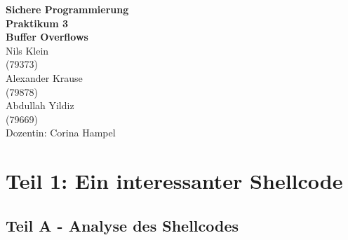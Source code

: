 \documentclass[12pt]{article}
\begin{document}
\begin{center}
  \textbf{\LARGE Sichere Programmierung} \\[1ex]%
  \textbf{\Large Praktikum 3}\\[1ex] %
  \textbf{\Large Buffer Overflows}\\[3ex] %
  Nils Klein \\ %
  (79373) \\[1ex] %
  Alexander Krause \\ %
  (79878) \\[1ex] %
  Abdullah Yildiz \\ %
  (79669) \\[1ex] %
  Dozentin: Corina Hampel \\%
  
\end{center}


\newpage
\setcounter{page}{2}
\tableofcontents

\newpage
\section{Teil 1: Ein interessanter Shellcode}
\subsection{Teil A - Analyse des Shellcodes}
\end{document}
